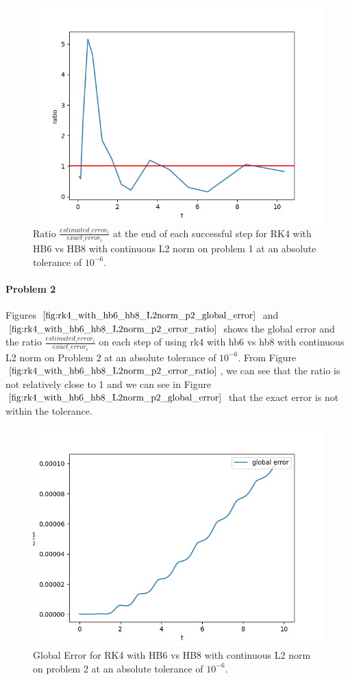 \begin{figure}[H]
\centering
\includegraphics[width=0.7\linewidth]{./figures/rk4_with_hb6_hb8_L2norm_p1_error_ratio}
\caption{Ratio $\frac{estimated\_error_i}{exact\_error_i}$ at the end of each successful step for RK4 with HB6 vs HB8 with continuous L2 norm on problem 1 at an absolute tolerance of $10^{-6}$.}
\label{fig:rk4_with_hb6_hb8_L2norm_p1_error_ratio}
\end{figure}

\paragraph{Problem 2} Figures $\ref{fig:rk4_with_hb6_hb8_L2norm_p2_global_error}$ and $\ref{fig:rk4_with_hb6_hb8_L2norm_p2_error_ratio}$ shows the global error and the ratio $\frac{estimated\_error_i}{exact\_error_i}$ on each step of using rk4 with hb6 vs hb8 with continuous L2 norm on Problem 2 at an absolute tolerance of $10^{-6}$. From Figure $\ref{fig:rk4_with_hb6_hb8_L2norm_p2_error_ratio}$, we can see that the ratio is not relatively close to 1 and we can see in Figure $\ref{fig:rk4_with_hb6_hb8_L2norm_p2_global_error}$ that the exact error is not within the tolerance.

\begin{figure}[H]
\centering
\includegraphics[width=0.7\linewidth]{./figures/rk4_with_hb6_hb8_L2norm_p2_global_error}
\caption{Global Error for RK4 with HB6 vs HB8 with continuous L2 norm on problem 2 at an absolute tolerance of $10^{-6}$.}
\label{fig:rk4_with_hb6_hb8_L2norm_p2_global_error}
\end{figure}


